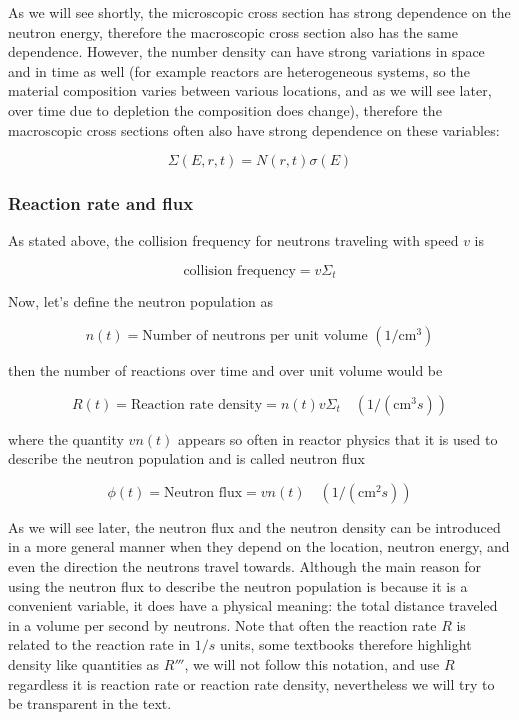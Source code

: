 As we will see shortly, the microscopic cross section has strong dependence on the neutron energy, therefore the macroscopic cross section also has the same dependence. However, the number density can have strong variations in space and in time as well (for example reactors are heterogeneous systems, so the material composition varies between various locations, and as we will see later, over time due to depletion the composition does change), therefore the macroscopic cross sections often also have strong dependence on these variables:

\[
\Sigma (E, r, t)=N(r,t)\sigma (E)
\]

\subsubsection{Reaction rate and flux}

As stated above, the collision frequency for neutrons traveling with speed $v$ is 

\begin{equation}
\text{collision frequency}=v\Sigma_t
\end{equation}

\noindent Now, let's define the neutron population as 

\begin{equation}
n(t)=\text{Number of neutrons per unit volume }(1/\text{cm}^3)
\end{equation}

\noindent then the number of reactions over time and over unit volume would be

\begin{equation}
R(t)=\text{Reaction rate density}=n(t)v\Sigma_t \quad (1/(\text{cm}^3s))
\end{equation}

\noindent where the quantity $vn(t)$ appears so often in reactor physics that it is used to describe the neutron population and is called neutron flux

\begin{equation}
\phi(t)=\text{Neutron flux}=vn(t) \quad (1/(\text{cm}^2s))
\end{equation}

As we will see later, the neutron flux and the neutron density can be introduced in a more general manner when they depend on the location, neutron energy, and even the direction the neutrons travel towards. Although the main reason for using the neutron flux to describe the neutron population is because it is a convenient variable, it does have a physical meaning: the total distance traveled in a volume per second by neutrons. Note that often the reaction rate $R$ is related to the reaction rate in $1/s$ units, some textbooks therefore highlight density like quantities as $R'''$, we will not follow this notation, and use $R$ regardless it is reaction rate or reaction rate density, nevertheless we will try to be transparent in the text.


